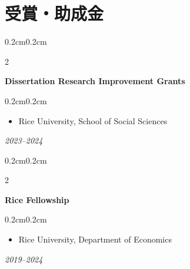 \documentclass[10pt, letterpaper]{article}
\newenvironment{highlights}{
    \begin{itemize}[
        topsep=0.10cm,
        parsep=0.10cm,
        partopsep=0pt,
        itemsep=0.0cm,
        leftmargin=0.4cm + 10pt
    ]
}{
    \end{itemize}
}
\newenvironment{onecolentry}{
    \begin{adjustwidth}{0.2cm}{0.2cm}
}{
    \end{adjustwidth}
}
\newenvironment{twocolentry}[2][]{
    \onecolentry
    \def\secondColumn{#2}
    \setcolumnwidth{\fill, 4.5cm}
    \begin{paracol}{2}
}{
    \switchcolumn \raggedleft \secondColumn
    \end{paracol}
    \end{adjustwidth}
}
\begin{document}
    \section{受賞・助成金}
    \begin{samepage}
        \begin{twocolentry}{\textit{2023--2024}}
            \textbf{Dissertation Research Improvement Grants}
            \vspace{0.10cm}
            \begin{onecolentry}
                \begin{highlights}
                    \item Rice University, School of Social Sciences
                \end{highlights}
            \end{onecolentry}
        \end{twocolentry}
    \end{samepage}
    \vspace{0.10cm}
    \begin{samepage}
        \begin{twocolentry}{\textit{2019--2024}}
            \textbf{Rice Fellowship}
            \vspace{0.10cm}
            \begin{onecolentry}
                \begin{highlights}
                    \item Rice University, Department of Economics
                \end{highlights}
            \end{onecolentry}
        \end{twocolentry}
    \end{samepage}
\end{document}
